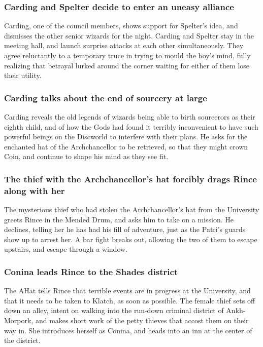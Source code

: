 \subsubsection{\Gls{Carding} and \Gls{Spelter} decide to enter an uneasy alliance}
\Gls{Carding}, one of the council members, shows support for \Gls{Spelter}'s idea, and dismisses
the other senior wizards for the night. \Gls{Carding} and \Gls{Spelter} stay in the meeting hall,
and launch surprise attacks at each other simultaneously. They agree reluctantly to a temporary
truce in trying to mould the boy's mind, fully realizing that betrayal lurked around the corner
waiting for either of them lose their utility.

\subsubsection{\Gls{Carding} talks about the end of sourcery at large}
\Gls{Carding} reveals the old legends of wizards being able to birth sourcerors as their eighth
child, and of how the Gods had found it terribly inconvenient to have such powerful beings on the
Discworld to interfere with their plans. He asks for the enchanted hat of the Archchancellor to
be retrieved, so that they might crown \Gls{Coin}, and continue to shape his mind as they see fit.

\subsubsection{The thief with the Archchancellor's hat forcibly drags \Gls{Rince} along with her}
The mysterious thief who had stolen the Archchancellor's hat from the University greets \Gls{Rince}
in the Mended Drum, and asks him to take on a mission. He declines, telling her he has had his
fill of adventure, just as the \Gls{Patri}'s guards show up to arrest her. A bar fight breaks out,
allowing the two of them to escape upstairs, and escape through a window.

\subsubsection{\Gls{Conina} leads \Gls{Rince} to the Shades district}
The \Gls{AHat} tells \Gls{Rince} that terrible events are in progress at the University, and that
it needs to be taken to Klatch, as soon as possible. The female thief sets off down an alley,
intent on walking into the run-down criminal district of Ankh-Morpork, and makes short work of
the petty thieves that accost them on their way in. She introduces herself as \Gls{Conina}, and
heads into an inn at the center of the district.

